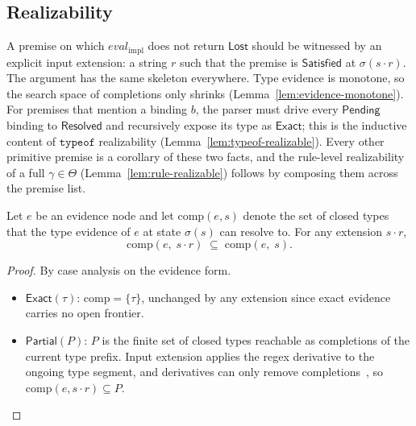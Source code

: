 \subsection*{Realizability}



A premise on which $\mathit{eval}_{\mathrm{impl}}$ does not return $\mathsf{Lost}$ should be witnessed by an explicit input extension: a string $r$ such that the premise is $\mathsf{Satisfied}$ at $\sigma(s \cdot r)$. The argument has the same skeleton everywhere. Type evidence is monotone, so the search space of completions only shrinks (Lemma~\ref{lem:evidence-monotone}). For premises that mention a binding $b$, the parser must drive every $\mathsf{Pending}$ binding to $\mathsf{Resolved}$ and recursively expose its type as $\mathsf{Exact}$; this is the inductive content of $\mathtt{typeof}$ realizability (Lemma~\ref{lem:typeof-realizable}). Every other primitive premise is a corollary of these two facts, and the rule-level realizability of a full $\gamma \in \Theta$ (Lemma~\ref{lem:rule-realizable}) follows by composing them across the premise list.

\begin{lemma}
	\label{lem:evidence-monotone}
	Let $e$ be an evidence node and let $\mathrm{comp}(e, s)$ denote the set of
	closed types that the type evidence of $e$ at state $\sigma(s)$ can resolve to.
	For any extension $s \cdot r$,
	\[
		\mathrm{comp}(e,\; s \cdot r) \;\subseteq\; \mathrm{comp}(e,\; s).
	\]
\end{lemma}

\begin{proof}
	By case analysis on the evidence form.
	\begin{itemize}
		\item $\mathsf{Exact}(\tau)$: $\mathrm{comp} = \{\tau\}$, unchanged by any
		      extension since exact evidence carries no open frontier.
		\item $\mathsf{Partial}(P)$: $P$ is the finite set of closed types reachable
		      as completions of the current type prefix. Input extension applies the
		      regex derivative to the ongoing type segment, and derivatives can only
		      remove completions~\cite{owens2009regex}, so
		      $\mathrm{comp}(e, s \cdot r) \subseteq P$.
	\end{itemize}
\end{proof}

